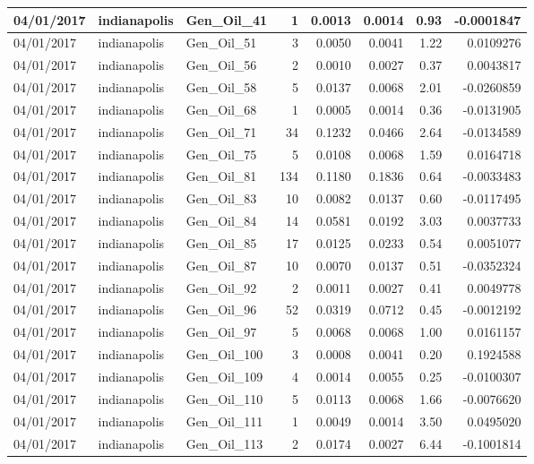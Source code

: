 \documentclass[
  letterpaper,
  DIV=11,
  numbers=noendperiod]{scrartcl}
\begin{document}
\begin{tabular}{l|l|l|r|r|r|r|r}
\hline
04/01/2017 & indianapolis & Gen\_Oil\_41 & 1 & 0.0013 & 0.0014 & 0.93 & -0.0001847\\
\hline
04/01/2017 & indianapolis & Gen\_Oil\_51 & 3 & 0.0050 & 0.0041 & 1.22 & 0.0109276\\
\hline
04/01/2017 & indianapolis & Gen\_Oil\_56 & 2 & 0.0010 & 0.0027 & 0.37 & 0.0043817\\
\hline
04/01/2017 & indianapolis & Gen\_Oil\_58 & 5 & 0.0137 & 0.0068 & 2.01 & -0.0260859\\
\hline
04/01/2017 & indianapolis & Gen\_Oil\_68 & 1 & 0.0005 & 0.0014 & 0.36 & -0.0131905\\
\hline
04/01/2017 & indianapolis & Gen\_Oil\_71 & 34 & 0.1232 & 0.0466 & 2.64 & -0.0134589\\
\hline
04/01/2017 & indianapolis & Gen\_Oil\_75 & 5 & 0.0108 & 0.0068 & 1.59 & 0.0164718\\
\hline
04/01/2017 & indianapolis & Gen\_Oil\_81 & 134 & 0.1180 & 0.1836 & 0.64 & -0.0033483\\
\hline
04/01/2017 & indianapolis & Gen\_Oil\_83 & 10 & 0.0082 & 0.0137 & 0.60 & -0.0117495\\
\hline
04/01/2017 & indianapolis & Gen\_Oil\_84 & 14 & 0.0581 & 0.0192 & 3.03 & 0.0037733\\
\hline
04/01/2017 & indianapolis & Gen\_Oil\_85 & 17 & 0.0125 & 0.0233 & 0.54 & 0.0051077\\
\hline
04/01/2017 & indianapolis & Gen\_Oil\_87 & 10 & 0.0070 & 0.0137 & 0.51 & -0.0352324\\
\hline
04/01/2017 & indianapolis & Gen\_Oil\_92 & 2 & 0.0011 & 0.0027 & 0.41 & 0.0049778\\
\hline
04/01/2017 & indianapolis & Gen\_Oil\_96 & 52 & 0.0319 & 0.0712 & 0.45 & -0.0012192\\
\hline
04/01/2017 & indianapolis & Gen\_Oil\_97 & 5 & 0.0068 & 0.0068 & 1.00 & 0.0161157\\
\hline
04/01/2017 & indianapolis & Gen\_Oil\_100 & 3 & 0.0008 & 0.0041 & 0.20 & 0.1924588\\
\hline
04/01/2017 & indianapolis & Gen\_Oil\_109 & 4 & 0.0014 & 0.0055 & 0.25 & -0.0100307\\
\hline
04/01/2017 & indianapolis & Gen\_Oil\_110 & 5 & 0.0113 & 0.0068 & 1.66 & -0.0076620\\
\hline
04/01/2017 & indianapolis & Gen\_Oil\_111 & 1 & 0.0049 & 0.0014 & 3.50 & 0.0495020\\
\hline
04/01/2017 & indianapolis & Gen\_Oil\_113 & 2 & 0.0174 & 0.0027 & 6.44 & -0.1001814\\

\end{tabular}
\end{document}
